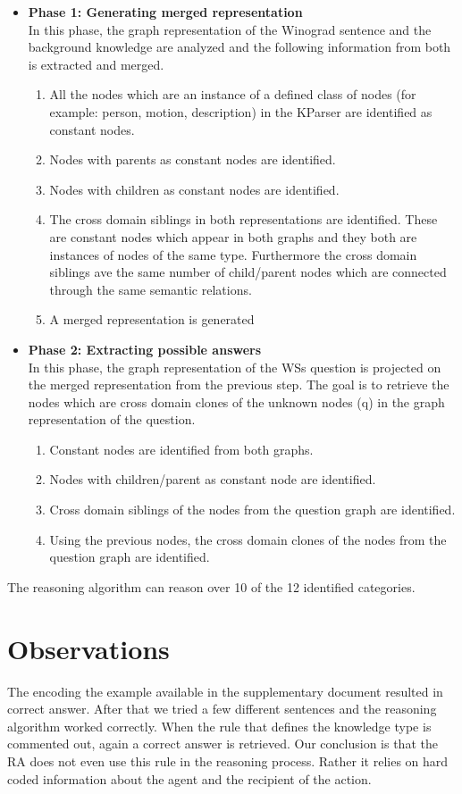 \begin{itemize}
	\item \textbf{Phase 1: Generating merged representation}\\
	 In this phase, the graph representation of the Winograd sentence and the background knowledge are analyzed and the following information from both is extracted and merged.
	\begin{enumerate}
		\item All the nodes which are an instance of a defined class of nodes (for example: person, motion, description) in the KParser are identified as constant nodes. 
		\item Nodes with parents as constant nodes are identified. 
		\item Nodes with children as constant nodes are identified. 
		\item The cross domain siblings in both representations are identified. These are constant nodes which appear in both graphs and they both are instances of nodes of the same type. Furthermore the cross domain siblings ave the same number of child/parent nodes which are connected through the same semantic relations. 
		\item A merged representation is generated
		
	\end{enumerate}
	\item \textbf{Phase 2: Extracting possible answers}\\
	In this phase, the graph representation of the WSs question is projected on the merged representation from the previous step. The goal is to retrieve the nodes which are cross domain clones of the unknown nodes (q)  in the graph representation of the question.
	\begin{enumerate}
		\item Constant nodes are identified from both graphs.
		\item Nodes with children/parent as constant node are identified. 
		\item Cross domain siblings of the nodes from the question graph are identified.
		\item Using the previous nodes, the cross domain clones of the nodes from the question graph are identified. 
	\end{enumerate}
\end{itemize}


The reasoning algorithm can reason over 10 of the 12 identified categories.

\section{Observations}
The encoding the example available in the supplementary document resulted in correct answer. 
After that we tried a few different sentences and the reasoning algorithm worked correctly. 
When the rule that defines the knowledge type is commented out, again a correct answer is retrieved. 
Our conclusion is that the RA does not even use this rule in the reasoning process. Rather it relies on hard coded information about the agent and the recipient of the action.